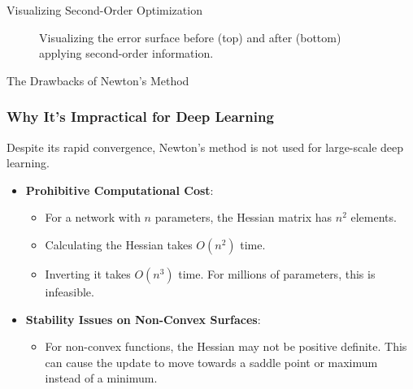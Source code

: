 \begin{frame}{Visualizing Second-Order Optimization}
\begin{figure}
        \caption{Visualizing the error surface before (top) and after (bottom) applying second-order information.}
    \end{figure}
    
\end{frame}





\begin{frame}{The Drawbacks of Newton's Method}
    \frametitle{Why It's Impractical for Deep Learning}
    Despite its rapid convergence, Newton's method is not used for large-scale deep learning.
    \begin{itemize}
        \item \textbf{Prohibitive Computational Cost}:
        \begin{itemize}
            \item For a network with $n$ parameters, the Hessian matrix has $n^2$ elements.
            \item Calculating the Hessian takes $O(n^2)$ time.
            \item Inverting it takes $O(n^3)$ time. For millions of parameters, this is infeasible.
        \end{itemize}
        \item \textbf{Stability Issues on Non-Convex Surfaces}:
        \begin{itemize}
            \item For non-convex functions, the Hessian may not be positive definite. This can cause the update to move towards a saddle point or maximum instead of a minimum.
        \end{itemize}
    \end{itemize}
\end{frame}

